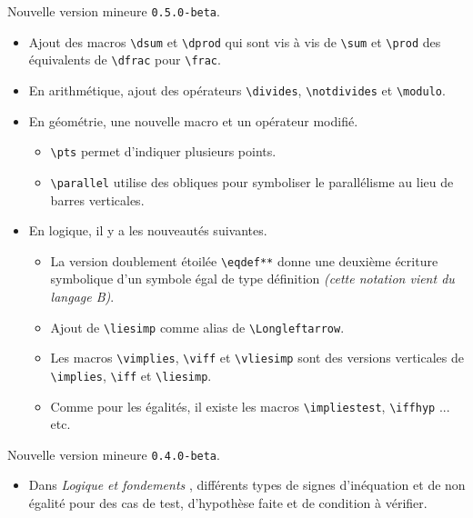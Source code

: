\documentclass[12pt,a4paper]{article}
\theoremstyle{definition}
\begin{document}
\begin{description}[leftmargin=1em]
	\setlength\itemsep{1em}




	\item[2019-09-27] Nouvelle version mineure \verb+0.5.0-beta+.
	\begin{itemize}
		\item Ajout des macros \verb+\dsum+ et \verb+\dprod+ qui sont vis à vis de \verb+\sum+ et \verb+\prod+ des équivalents de \verb+\dfrac+ pour \verb+\frac+.

		\item En arithmétique, ajout des opérateurs \verb+\divides+, \verb+\notdivides+ et \verb+\modulo+.

		\item En géométrie, une nouvelle macro et un opérateur modifié.
		\begin{itemize}
			\item \verb+\pts+ permet d'indiquer plusieurs points.

			\item \verb+\parallel+ utilise des obliques pour symboliser le parallélisme au lieu de barres verticales.
		\end{itemize}

		\item En logique, il y a les nouveautés suivantes.
		\begin{itemize}
			\item La version doublement étoilée \verb+\eqdef**+ donne une deuxième écriture symbolique d'un symbole égal de type définition \emph{(cette notation vient du langage B)}.

			\item Ajout de \verb+\liesimp+ comme alias de \verb+\Longleftarrow+.

			\item Les macros \verb+\vimplies+, \verb+\viff+ et \verb+\vliesimp+ sont des versions verticales de \verb+\implies+, \verb+\iff+ et \verb+\liesimp+.

			\item Comme pour les égalités, il existe les macros \verb+\impliestest+, \verb+\iffhyp+ ... etc.
		\end{itemize}
	\end{itemize}


	\item[2019-09-06]  Nouvelle version mineure \verb+0.4.0-beta+.
	\begin{itemize}
		\item Dans \emph{\og Logique et fondements \fg}, différents types de signes d'inéquation et de non égalité pour des cas de test, d'hypothèse faite et de condition à vérifier.


\end{itemize}
\end{description}
\end{document}
